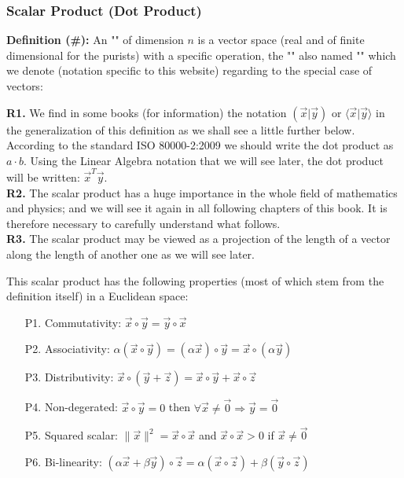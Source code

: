 	\pagebreak	
	\subsubsection{Scalar Product (Dot Product)}\label{dot product}
	\textbf{Definition (\#\mydef):} An "" of dimension $n$ is a vector space (real and of finite dimensional for the purists) with a specific operation, the "" also named "" which we denote (notation specific to this website) regarding to the special case of vectors:
	
	\begin{tcolorbox}[title=Remarks,colframe=black,arc=10pt]
	\textbf{R1.} We find in some books (for information) the notation $\left( \vec{x}|\vec{y}\right)$ or $\langle \vec{x} | \vec{y} \rangle$ in the generalization of this definition as we shall see a little further below. According to the standard ISO 80000-2:2009 we should write the dot product as $a\cdot b$. Using the Linear Algebra notation that we will see later, the dot product will be written: $\vec{x}^T\vec{y}$.\\
	
	\textbf{R2.} The scalar product has a huge importance in the whole field of mathematics and physics; and we will see it again in all following chapters of this book. It is therefore necessary to carefully understand what follows.\\
	
	\textbf{R3.} The scalar product may be viewed as a projection of the length of a vector along the length of another one as we will see later.
	\end{tcolorbox}	
	This scalar product has the following properties (most of which stem from the definition itself) in a Euclidean space:
	\begin{enumerate}
		\item[P1.] Commutativity: $\vec{x}\circ\vec{y}=\vec{y}\circ\vec{x}$
		\item[P2.] Associativity: $\alpha(\vec{x}\circ\vec{y})=(\alpha\vec{x})\circ\vec{y}=\vec{x}\circ(\alpha\vec{y}) $
		\item[P3.] Distributivity: $\vec{x}\circ(\vec{y}+\vec{z})=\vec{x}\circ\vec{y}+\vec{x}\circ\vec{z}$
		\item[P4.] Non-degerated: $\vec{x}\circ\vec{y}=0$ then $\forall\vec{x}\neq\vec{0}\Rightarrow \vec{y}=\vec{0}$
		\item[P5.] Squared scalar: $\|\vec{x}\|^2=\vec{x}\circ\vec{x}$ and $\vec{x}\circ\vec{x}>0$ if $\vec{x}\neq \vec{0}$
		\item[P6.] Bi-linearity: $(\alpha\vec{x}+\beta\vec{y})\circ\vec{z}=\alpha(\vec{x}\circ	\vec{z})+\beta(\vec{y}\circ\vec{z})$
	\end{enumerate}
